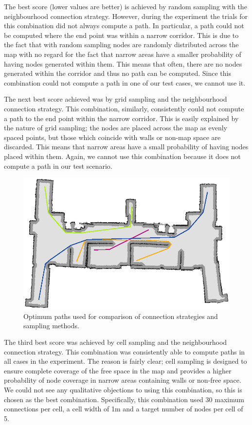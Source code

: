 \documentclass[conference]{IEEEtran}
\begin{document}
The best score (lower values are better) is achieved by random sampling with the neighbourhood connection strategy. However, during the experiment the trials for this combination did not always compute a path. In particular, a path could not be computed where the end point was within a narrow corridor. This is due to the fact that with random sampling nodes are randomly distributed across the map with no regard for the fact that narrow areas have a smaller probability of having nodes generated within them. This means that often, there are no nodes generated within the corridor and thus no path can be computed. Since this combination could not compute a path in one of our test cases, we cannot use it.

The next best score achieved was by grid sampling and the neighbourhood connection strategy. This combination, similarly, consistently could not compute a path to the end point within the narrow corridor. This is easily explained by the nature of grid sampling; the nodes are placed across the map as evenly spaced points, but those which coincide with walls or non-map space are discarded. This means that narrow areas have a small probability of having nodes placed within them. Again, we cannot use this combination because it does not compute a path in our test scenario.
\begin{figure}
  \includegraphics[width=\columnwidth]{optimumpaths}
  \caption{Optimum paths used for comparison of connection strategies and sampling methods.}
  \label{fig:optimum}
\end{figure}
The third best score was achieved by cell sampling and the neighbourhood connection strategy. This combination was consistently able to compute paths in all cases in the experiment. The reason is fairly clear; cell sampling is designed to ensure complete coverage of the free space in the map and provides a higher probability of node coverage in narrow areas containing walls or non-free space. We could not see any qualitative objections to using this combination, so this is chosen as the best combination. Specifically, this combination used 30 maximum connections per cell, a cell width of 1m and a target number of nodes per cell of 5.
\end{document}
